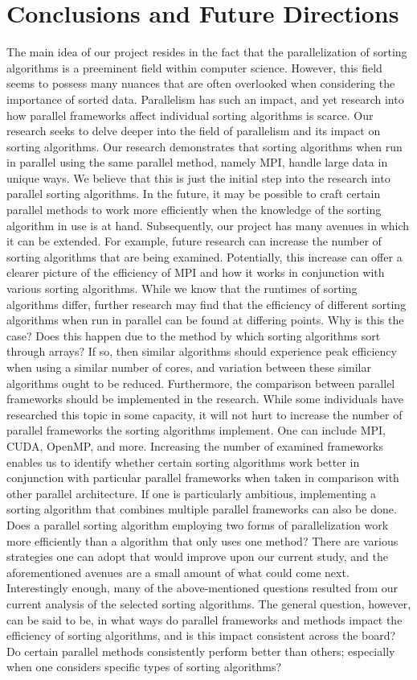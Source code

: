 \documentclass[11pt,twocolumn]{article}
\begin{document}
\section{Conclusions and Future Directions}\label{conc} 
The main idea of our project resides in the fact that the parallelization of sorting algorithms is a preeminent field within computer science. However, this field seems to possess many nuances that are often overlooked when considering the importance of sorted data. Parallelism has such an impact, and yet research into how parallel frameworks affect individual sorting algorithms is scarce. Our research seeks to delve deeper into the field of parallelism and its impact on sorting algorithms. Our research demonstrates that sorting algorithms when run in parallel using the same parallel method, namely MPI, handle large data in unique ways. We believe that this is just the initial step into the research into parallel sorting algorithms. In the future, it may be possible to craft certain parallel methods to work more efficiently when the knowledge of the sorting algorithm in use is at hand. Subsequently, our project has many avenues in which it can be extended. For example, future research can increase the number of sorting algorithms that are being examined. Potentially, this increase can offer a clearer picture of the efficiency of MPI and how it works in conjunction with various sorting algorithms. While we know that the runtimes of sorting algorithms differ, further research may find that the efficiency of different sorting algorithms when run in parallel can be found at differing points. Why is this the case? Does this happen due to the method by which sorting algorithms sort through arrays? If so, then similar algorithms should experience peak efficiency when using a similar number of cores, and variation between these similar algorithms ought to be reduced. Furthermore, the comparison between parallel frameworks should be implemented in the research. While some individuals have researched this topic in some capacity, it will not hurt to increase the number of parallel frameworks the sorting algorithms implement. One can include MPI, CUDA, OpenMP, and more. Increasing the number of examined frameworks enables us to identify whether certain sorting algorithms work better in conjunction with particular parallel frameworks when taken in comparison with other parallel architecture. If one is particularly ambitious, implementing a sorting algorithm that combines multiple parallel frameworks can also be done. Does a parallel sorting algorithm employing two forms of parallelization work more efficiently than a algorithm that only uses one method? There are various strategies one can adopt that would improve upon our current study, and the aforementioned avenues are a small amount of what could come next. Interestingly enough, many of the above-mentioned questions resulted from our current analysis of the selected sorting algorithms. The general question, however, can be said to be, in what ways do parallel frameworks and methods impact the efficiency of sorting algorithms, and is this impact consistent across the board? Do certain parallel methods consistently perform better than others; especially when one considers specific types of sorting algorithms?
\end{document}
